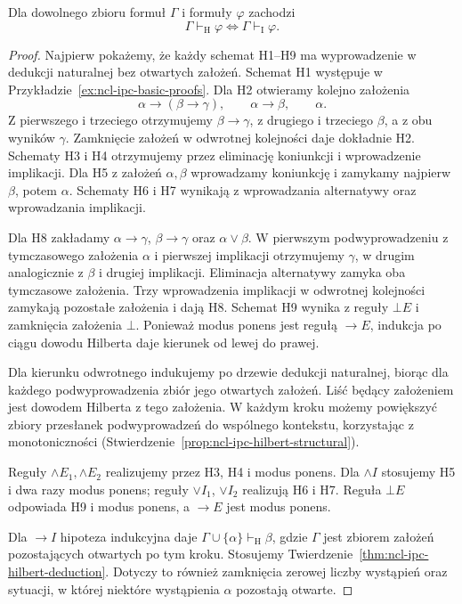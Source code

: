 \begin{twierdzenie}
\label{thm:ncl-ipc-hilbert-equivalence}
Dla dowolnego zbioru formuł $\Gamma$ i formuły
$\varphi$ zachodzi
\[
 \Gamma\vdash_{\mathrm H}\varphi
 \iff \Gamma\vdash_{\mathrm I}\varphi.
\]
\end{twierdzenie}
\begin{proof}
Najpierw pokażemy, że każdy schemat H1--H9 ma
wyprowadzenie w dedukcji naturalnej bez otwartych
założeń. Schemat H1 występuje w
Przykładzie~\ref{ex:ncl-ipc-basic-proofs}.
Dla H2 otwieramy kolejno założenia
\[
 \alpha\to(\beta\to\gamma),\qquad
 \alpha\to\beta,\qquad \alpha.
\]
Z pierwszego i trzeciego otrzymujemy $\beta\to\gamma$,
z drugiego i trzeciego $\beta$, a z obu wyników
$\gamma$. Zamknięcie założeń w odwrotnej kolejności
daje dokładnie H2.
Schematy H3 i H4 otrzymujemy przez eliminację
koniunkcji i wprowadzenie implikacji. Dla H5
z założeń $\alpha,\beta$ wprowadzamy koniunkcję
i zamykamy najpierw $\beta$, potem $\alpha$.
Schematy H6 i H7 wynikają z wprowadzania alternatywy
oraz wprowadzania implikacji.

Dla H8 zakładamy $\alpha\to\gamma$,
$\beta\to\gamma$ oraz $\alpha\vee\beta$.
W pierwszym podwyprowadzeniu z tymczasowego
założenia $\alpha$ i pierwszej implikacji
otrzymujemy $\gamma$, w drugim analogicznie
z $\beta$ i drugiej implikacji.
Eliminacja alternatywy zamyka oba tymczasowe
założenia. Trzy wprowadzenia implikacji
w odwrotnej kolejności zamykają pozostałe
założenia i dają H8. Schemat H9 wynika z reguły
$\bot E$ i zamknięcia założenia $\bot$.
Ponieważ modus ponens jest regułą $\to E$,
indukcja po ciągu dowodu Hilberta daje kierunek
od lewej do prawej.

Dla kierunku odwrotnego indukujemy po drzewie
dedukcji naturalnej, biorąc dla każdego
podwyprowadzenia zbiór jego otwartych założeń.
Liść będący założeniem jest dowodem Hilberta
z tego założenia. W każdym kroku możemy powiększyć
zbiory przesłanek podwyprowadzeń do wspólnego
kontekstu, korzystając z monotoniczności
(Stwierdzenie~\ref{prop:ncl-ipc-hilbert-structural}).

Reguły $\wedge E_1,\wedge E_2$ realizujemy przez
H3, H4 i modus ponens. Dla $\wedge I$ stosujemy
H5 i dwa razy modus ponens; reguły $\vee I_1$,
$\vee I_2$ realizują H6 i H7. Reguła $\bot E$
odpowiada H9 i modus ponens, a $\to E$ jest
modus ponens.

Dla $\to I$ hipoteza indukcyjna daje
$\Gamma\cup\{\alpha\}\vdash_{\mathrm H}\beta$,
gdzie $\Gamma$ jest zbiorem założeń pozostających
otwartych po tym kroku. Stosujemy
Twierdzenie~\ref{thm:ncl-ipc-hilbert-deduction}.
Dotyczy to również zamknięcia zerowej liczby wystąpień
oraz sytuacji, w której niektóre wystąpienia
$\alpha$ pozostają otwarte.


\end{proof}

